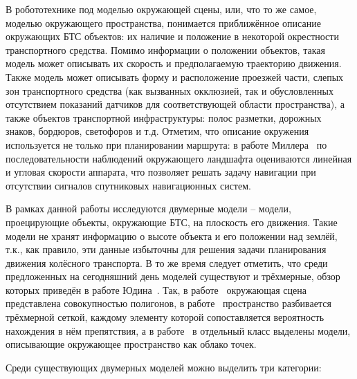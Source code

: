 В робототехнике под моделью окружающей сцены, или, что то же самое, моделью окружающего пространства, понимается приближённое описание окружающих БТС объектов: их наличие и положение в некоторой окрестности транспортного средства. Помимо информации о положении объектов, такая модель может описывать их скорость и предполагаемую траекторию движения. Также модель может описывать форму и расположение проезжей части, слепых зон транспортного средства (как вызванных окклюзией, так и обусловленных отсутствием показаний датчиков для соответствующей области пространства), а также объектов транспортной инфраструктуры: полос разметки, дорожных знаков, бордюров, светофоров и т.д. Отметим, что описание окружения используется не только при планировании маршрута: в работе Миллера~\autocite{miller2025navigation} по последовательности наблюдений окружающего ландшафта оцениваются линейная и угловая скорости аппарата, что позволяет решать задачу навигации при отсутствии сигналов спутниковых навигационных систем.

В рамках данной работы исследуются двумерные модели -- модели, проецирующие объекты, окружающие БТС, на плоскость его движения. Такие модели не хранят информацию о высоте объекта и его положении над землёй, т.к., как правило, эти данные избыточны для решения задачи планирования движения колёсного транспорта. В то же время следует отметить, что среди предложенных на сегодняшний день моделей существуют и трёхмерные, обзор которых приведён в работе Юдина~\cite{yudin2025}. Так, в работе~\cite{oliveira2015scene} окружающая сцена представлена совокупностью полигонов, в работе~\cite{dryanovski2010multi} пространство разбивается трёхмерной сеткой, каждому элементу которой сопоставляется вероятность нахождения в нём препятствия, а в работе~\cite{feng2025survey} в отдельный класс выделены модели, описывающие окружающее пространство как облако точек. 

Среди существующих двумерных моделей можно выделить три категории:

